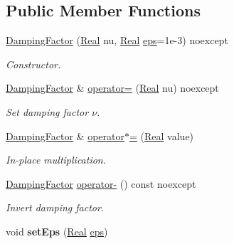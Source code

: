 \subsection*{\-Public \-Member \-Functions}
\begin{DoxyCompactItemize}
\item 
\hyperlink{classSpacy_1_1DampingFactor_a70e93ad9b0245cbc644d0f930d0cadc0}{\-Damping\-Factor} (\hyperlink{classSpacy_1_1Real}{\-Real} nu, \hyperlink{classSpacy_1_1Real}{\-Real} \hyperlink{classSpacy_1_1Mixin_1_1Eps_a812b99b0abc1d78a34b4114907f23f52}{eps}=1e-\/3) noexcept
\begin{DoxyCompactList}\small\item\em \-Constructor. \end{DoxyCompactList}\item 
\hyperlink{classSpacy_1_1DampingFactor}{\-Damping\-Factor} \& \hyperlink{classSpacy_1_1DampingFactor_ae28aa1372882e7cc94ff64e16835e7bd}{operator=} (\hyperlink{classSpacy_1_1Real}{\-Real} nu) noexcept
\begin{DoxyCompactList}\small\item\em \-Set damping factor $\nu$. \end{DoxyCompactList}\item 
\hypertarget{classSpacy_1_1DampingFactor_a58e54413ae9d5a78e90a7f99c58a127a}{\hyperlink{classSpacy_1_1DampingFactor}{\-Damping\-Factor} \& \hyperlink{classSpacy_1_1DampingFactor_a58e54413ae9d5a78e90a7f99c58a127a}{operator$\ast$=} (\hyperlink{classSpacy_1_1Real}{\-Real} value)}\label{classSpacy_1_1DampingFactor_a58e54413ae9d5a78e90a7f99c58a127a}

\begin{DoxyCompactList}\small\item\em \-In-\/place multiplication. \end{DoxyCompactList}\item 
\hypertarget{classSpacy_1_1DampingFactor_ad5f845e6bbf9f232e09aeea07ab4c32e}{\hyperlink{classSpacy_1_1DampingFactor}{\-Damping\-Factor} \hyperlink{classSpacy_1_1DampingFactor_ad5f845e6bbf9f232e09aeea07ab4c32e}{operator-\/} () const noexcept}\label{classSpacy_1_1DampingFactor_ad5f845e6bbf9f232e09aeea07ab4c32e}

\begin{DoxyCompactList}\small\item\em \-Invert damping factor. \end{DoxyCompactList}\item 
\hypertarget{classSpacy_1_1Mixin_1_1Eps_a6b4c38a60848c0ab665fb3a81e181786}{void {\bfseries set\-Eps} (\hyperlink{classSpacy_1_1Real}{\-Real} \hyperlink{classSpacy_1_1Mixin_1_1Eps_a812b99b0abc1d78a34b4114907f23f52}{eps})}\label{classSpacy_1_1Mixin_1_1Eps_a6b4c38a60848c0ab665fb3a81e181786}


\end{DoxyCompactItemize}
